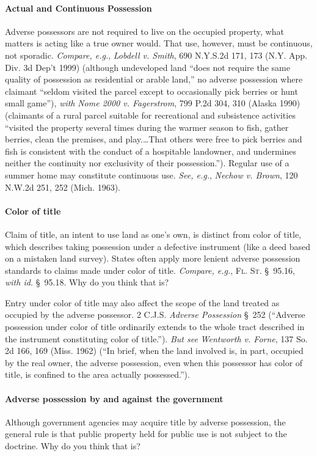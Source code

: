 \paragraph{Actual and Continuous Possession} Adverse possessors are
not required to live on the occupied property, what matters is acting like a
true owner would. That use, however, must be continuous, not sporadic.
\textit{Compare, e.g.}, \emph{Lobdell v. Smith}, 690 N.Y.S.2d 171, 173 (N.Y.
App. Div.
3d Dep't 1999) (although undeveloped land ``does not require the same quality
of possession as residential or arable land,'' no adverse possession where
claimant ``seldom visited the parcel except to occasionally pick berries or
hunt small game''), \textit{with} \emph{Nome 2000 v. Fagerstrom}, 799 P.2d 304,
310
(Alaska 1990) (claimants of a rural parcel suitable for recreational and
subsistence activities ``visited the property several times during the warmer
season to fish, gather berries, clean the premises, and play.\ldots That
others were free to pick berries and fish is consistent with the conduct of a
hospitable landowner, and undermines neither the continuity nor exclusivity of
their possession.''). Regular use of a summer home may constitute continuous
use. \textit{See, e.g.}, \emph{Nechow v. Brown}, 120 N.W.2d 251, 252 (Mich.
1963).

\paragraph{Color of title} Claim of title, an intent to use land as one's
own, is distinct from color of title, which describes taking possession under a
defective instrument (like a deed based on a mistaken land survey). States
often apply more lenient adverse possession standards to claims made under
color of title. \textit{Compare, e.g.}, \textsc{Fl. St.} \S~95.16, \textit{with
id.} \S~95.18. Why do you think that is? 

Entry under color of title may also affect the scope of the land treated as
occupied by the adverse possessor. 2 C.J.S. \textit{Adverse Possession} \S~252
(``Adverse possession under color of title ordinarily extends to the whole
tract described in the instrument constituting color of title.''). \textit{But
see} \emph{Wentworth v. Forne}, 137 So. 2d 166, 169 (Miss. 1962) (``In brief, when the
land involved is, in part, occupied by the real owner, the adverse possession,
even when this possessor has color of title, is confined to the area actually
possessed.'').

\paragraph{Adverse possession by and against the government}
Although government agencies may acquire title by adverse possession, the
general rule is that public property held for public use is not subject to the
doctrine. Why do you think that is?

